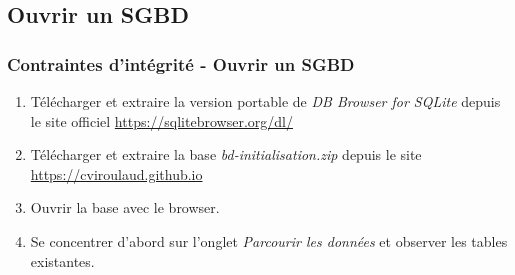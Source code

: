 \documentclass[svgnames,11pt]{beamer}
\begin{document}
\subsection{Ouvrir un SGBD}
\begin{frame}
    \frametitle{Contraintes d'intégrité - Ouvrir un SGBD}

    \begin{activite}
        \begin{enumerate}
            \item Télécharger et extraire la version portable de \emph{DB Browser for SQLite} depuis le site officiel \mbox{\url{https://sqlitebrowser.org/dl/}}
            \item Télécharger et extraire la base \emph{bd-initialisation.zip} depuis le site \mbox{\url{https://cviroulaud.github.io}}
            \item Ouvrir la base avec le browser.
            \item Se concentrer d'abord sur l'onglet \emph{Parcourir les données} et observer les tables existantes.
        \end{enumerate}
    \end{activite}

\end{frame}
\end{document}
